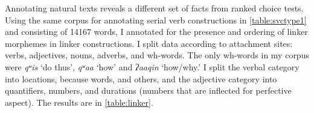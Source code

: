 \begin{comment}
\ex \label{speakingoutside1}
\begingl
\glpreamble ƛ̓aaʔaasḥiis ciiqmałap. //
\gla ƛ̓aaʔaas-(q)ḥ=(y)iis ciiqmałapa //
\glb outide-\textsc{link}=\textsc{weak.1sg} speak.publicly //
\glft `I'm speaking outside.' (\textbf{Q}, Sophie Billy) //
\endgl
\xe

\ex~ \label{speakingoutside2}
\begingl
\glpreamble ciiqmałapayiis hiłḥ ƛ̓aaʔaas. //
\gla ciiqmałapa=(y)iis hił-(q)ḥ ƛ̓aaʔaas //
\glb speak.publicly=\textsc{weak.1sg} be.at-\textsc{link} outside //
\glft `I'm speaking outside.' (\textbf{Q}, Sophie Billy) //
\endgl
\xe

\ex~ \label{*speakingoutside3}
\begingl
\glpreamble *ciiqmałapḥiis ƛ̓aaʔaas. //
\gla ciiqmałapa-(q)ḥ=(y)iis hił-(q)ḥ ƛ̓aaʔaas //
\glb speak.publicly-\textsc{link}=\textsc{weak.1sg} be.at-\textsc{link} outside //
\glft Intended: `I'm speaking outside.' (\textbf{Q}, Sophie Billy) //
\endgl
\xe
\end{comment}

Annotating natural texts reveals a different set of facts from ranked choice tests. Using the same corpus for annotating serial verb constructions in  \cref{table:svctype1} and consisting of 14167 words, I annotated for the presence and ordering of linker morphemes in linker constructions. I split data according to attachment sites: verbs, adjectives, nouns, adverbs, and wh-words. The only wh-words in my corpus were \textit{qʷis} `do thus', \textit{qʷaa} `how' and \textit{ʔaaqin} `how/why.' I split the verbal category into locations, because words, and others, and the adjective category into quantifiers, numbers, and durations (numbers that are inflected for perfective aspect). The results are in \cref{table:linker}.

\vspace{-10pt}

